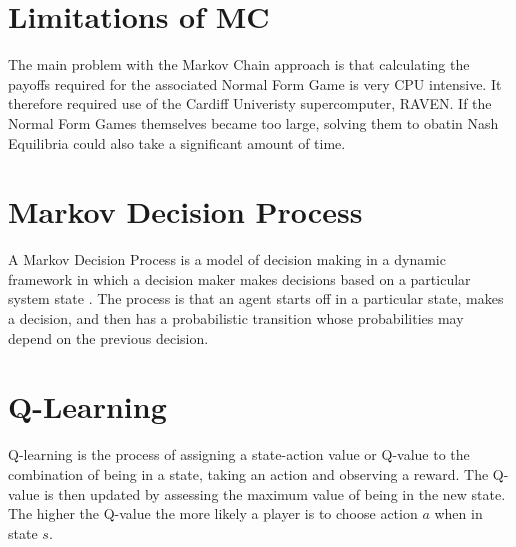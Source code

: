 \documentclass[a0,landscape]{a0poster}
\begin{document}
\begin{multicols}{3}
\color{Olive}
\section*{Limitations of MC}
The main problem with the Markov Chain approach is that calculating the payoffs required for the associated Normal Form Game is very CPU intensive.
It therefore required use of the Cardiff Univeristy supercomputer, RAVEN.
If the Normal Form Games themselves became too large, solving them to obatin Nash Equilibria could also take a significant amount of time.


\color{SteelBlue}
\section*{Markov Decision Process}
A Markov Decision Process is a model of decision making in a dynamic framework in which a decision maker makes decisions based on a particular system state \cite{puterman2009markov}.
The process is that an agent starts off in a particular state, makes a decision, and then has a probabilistic transition whose probabilities may depend on the previous decision.

\section*{Q-Learning}
Q-learning is the process of assigning a state-action value or Q-value to the combination of being in a state, taking an action and observing a reward.
The Q-value is then updated by assessing the maximum value of being in the new state.
The higher the Q-value the more likely a player is to choose action $a$ when in state $s$.

\end{multicols}
\end{document}
